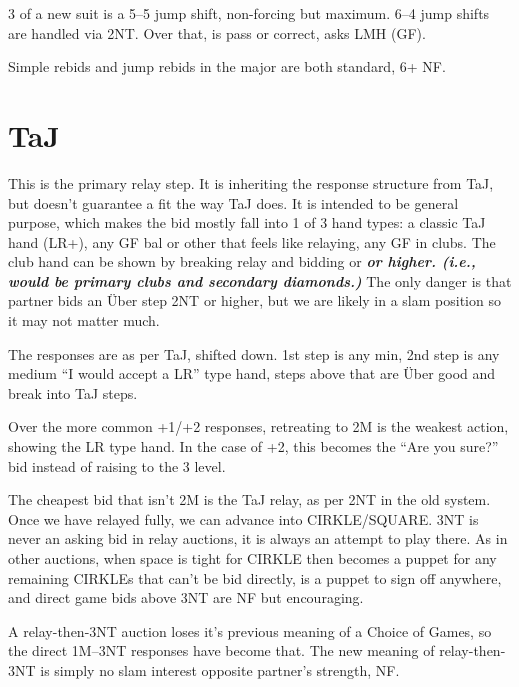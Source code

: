 \documentclass[tom-ari]{subfile}
\begin{document}
	3 of a new suit is a 5--5 jump shift, non-forcing but maximum. 6--4 jump shifts are handled via 2NT. Over that,  is pass or correct,  asks LMH (GF).
	
	Simple rebids and jump rebids in the major are both standard, 6+ NF.
		
	\section[2C TaJ]{ TaJ}
	
	This is the primary relay step.  It is inheriting the response structure from TaJ, but doesn't guarantee a fit the way TaJ does.  It is intended to be general purpose, which makes the bid mostly fall into 1 of 3 hand types:  a classic TaJ hand (LR+), any GF bal or other that feels like relaying, any GF in clubs.  The club hand can be shown by breaking relay and bidding  or \textbf{\textit{or higher. (i.e.,  would be primary clubs and secondary diamonds.)}} The only danger is that partner bids an \"Uber step 2NT or higher, but we are likely in a slam position so it may not matter much.
	
	\reversemarginpar
	
	The responses are as per TaJ, shifted down.  1st step is any min, 2nd step is any medium ``I would accept a LR'' type hand, steps above that are \"Uber good and break into TaJ steps.
	
	Over the more common +1/+2 responses, retreating to 2M is the weakest action, showing the LR type hand.  In the case of +2, this becomes the ``Are you sure?'' bid instead of raising to the 3 level.
	
	The cheapest bid that isn't 2M is the TaJ relay, as per 2NT in the old system.  Once we have relayed fully, we can advance into CIRKLE/SQUARE. 3NT is never an asking bid in relay auctions, it is always an attempt to play there. As in other auctions, when space is tight for CIRKLE then  becomes a puppet for any remaining CIRKLEs that can't be bid directly,  is a puppet to sign off anywhere, and direct game bids above 3NT are NF but encouraging.

	A relay-then-3NT auction loses it's previous meaning of a Choice of Games, so the direct 1M--3NT responses have become that. The new meaning of relay-then-3NT is simply no slam interest opposite partner's strength, NF.
	
\end{document}
